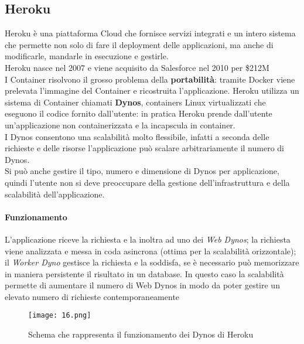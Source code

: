 \subsection{Heroku}
Heroku è una piattaforma Cloud che fornisce servizi integrati e un intero sistema che permette non solo di fare il deployment delle applicazioni, ma anche di modificarle, mandarle in esecuzione e gestirle.\\
Heroku nasce nel 2007 e viene acquisito da Salesforce nel 2010 per \$212M\\
I Container risolvono il grosso problema della \textbf{portabilità}: tramite Docker viene prelevata l’immagine del Container e ricostruita l’applicazione.  Heroku utilizza un sistema di Container chiamati \textbf{Dynos}, containers Linux virtualizzati che eseguono il codice fornito dall’utente: in pratica Heroku prende dall'utente un'applicazione non containerizzata e la incapscula in container.\\
I Dynos consentono una scalabilità molto flessibile, infatti a seconda delle richieste e delle risorse l’applicazione può scalare arbitrariamente il numero di Dynos.\\
Si può anche gestire il tipo, numero e dimensione di Dynos per applicazione, quindi l’utente non si deve preoccupare della gestione dell’infrastruttura e della scalabilità dell’applicazione.\\

\paragraph{Funzionamento} L'applicazione riceve la richiesta e la inoltra ad uno dei \textit{Web Dynos}; la richiesta viene analizzata e messa in coda asincrona (ottima per la scalabilità orizzontale); il \textit{Worker Dyno} gestisce la richiesta e la soddisfa, se è necessario può memorizzare in maniera persistente il risultato in un database. In questo caso la scalabilità permette di aumentare il numero di Web Dynos in modo da poter gestire un elevato numero di richieste contemporaneamente
\begin{figure}[h!]
    \centering
    \texttt{[image: 16.png]}
    \caption{Schema che rappresenta il funzionamento dei Dynos di Heroku}
\end{figure}

